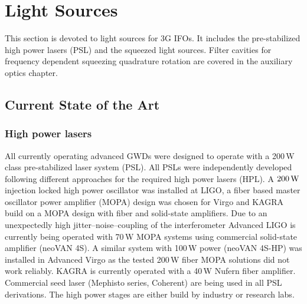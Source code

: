 
\chapter{Light Sources}
\label{sec:Light_sources}

This section is devoted to light sources for 3G IFOs. It includes the pre-stabilized high power lasers (PSL) and the squeezed light sources. Filter cavities for frequency dependent squeezing quadrature rotation are covered in the auxiliary optics chapter.

\section{Current State of the Art}
\subsection{High power lasers}
All currently operating advanced GWDs were designed to operate with a 200\,W class pre-stabilized laser system (PSL). All PSLs were independently developed following different approaches for the required high power lasers (HPL). A $ 200\,{\rm W} $ injection locked high power oscillator was installed at LIGO, a fiber based master oscillator power amplifier (MOPA) design was chosen for Virgo and KAGRA build on a MOPA design with fiber and solid-state amplifiers. Due to an unexpectedly high jitter--noise--coupling of the interferometer Advanced LIGO is currently being operated with 70\,W MOPA systems using commercial solid-state amplifier (neoVAN 4S). A similar system with 100\,W power (neoVAN 4S-HP) was installed in Advanced Virgo as the tested 200\,W fiber MOPA solutions did not work reliably. KAGRA is currently operated with a 40\,W Nufern fiber amplifier. Commercial seed laser (Mephisto series, Coherent) are being used in all PSL derivations. The high power stages are either build by industry or research labs. 


